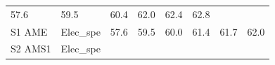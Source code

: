 \documentclass[]{article}
\begin{document}
\begin{longtable}[]{@{}llrrrrrr@{}}
\begin{minipage}[t]{0.09\columnwidth}
57.6\strut
\end{minipage} & \begin{minipage}[t]{0.09\columnwidth}\raggedleft\strut
59.5\strut
\end{minipage} & \begin{minipage}[t]{0.09\columnwidth}\raggedleft\strut
60.4\strut
\end{minipage} & \begin{minipage}[t]{0.09\columnwidth}\raggedleft\strut
62.0\strut
\end{minipage} & \begin{minipage}[t]{0.09\columnwidth}\raggedleft\strut
62.4\strut
\end{minipage} & \begin{minipage}[t]{0.09\columnwidth}\raggedleft\strut
62.8\strut
\end{minipage}\tabularnewline
\begin{minipage}[t]{0.14\columnwidth}\raggedright\strut
S1 AME\strut
\end{minipage} & \begin{minipage}[t]{0.13\columnwidth}\raggedright\strut
Elec\_spe\strut
\end{minipage} & \begin{minipage}[t]{0.09\columnwidth}\raggedleft\strut
57.6\strut
\end{minipage} & \begin{minipage}[t]{0.09\columnwidth}\raggedleft\strut
59.5\strut
\end{minipage} & \begin{minipage}[t]{0.09\columnwidth}\raggedleft\strut
60.0\strut
\end{minipage} & \begin{minipage}[t]{0.09\columnwidth}\raggedleft\strut
61.4\strut
\end{minipage} & \begin{minipage}[t]{0.09\columnwidth}\raggedleft\strut
61.7\strut
\end{minipage} & \begin{minipage}[t]{0.09\columnwidth}\raggedleft\strut
62.0\strut
\end{minipage}\tabularnewline
\begin{minipage}[t]{0.14\columnwidth}\raggedright\strut
S2 AMS1\strut
\end{minipage} & \begin{minipage}[t]{0.13\columnwidth}\raggedright\strut
Elec\_spe\strut
\end{minipage} & \begin{minipage}[t]{0.09\columnwidth}\raggedleft\strut

\end{minipage}
\end{longtable}
\end{document}

